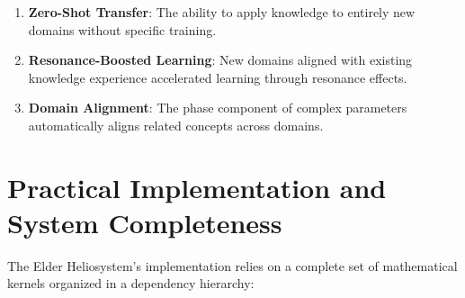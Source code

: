 \begin{enumerate}
    \item \textbf{Zero-Shot Transfer}: The ability to apply knowledge to entirely new domains without specific training.
    
    \item \textbf{Resonance-Boosted Learning}: New domains aligned with existing knowledge experience accelerated learning through resonance effects.
    
    \item \textbf{Domain Alignment}: The phase component of complex parameters automatically aligns related concepts across domains.
\end{enumerate}

\section{Practical Implementation and System Completeness}

The Elder Heliosystem's implementation relies on a complete set of mathematical kernels organized in a dependency hierarchy:

